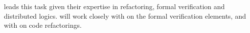 \begin{Workpackage}{\thewpno}
\begin{Task}
\SA leads this task given their expertise in refactoring, formal verification and distributed logics. \SA will work closely with \SCCHshort on the formal verification elements, and with \UCM on code refactorings.

\end{Task}

%
%
%




\end{Workpackage}
